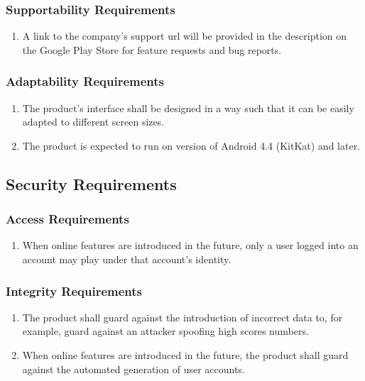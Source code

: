 \documentclass[]{article}
\begin{document}
\subsubsection{Supportability Requirements}
\label{ssub:supportability_requirements}
\begin{enumerate}[{MS}1. ]
	\resumeEnum
	\item A link to the company's support url will be provided in the description on the Google Play Store for feature requests and bug reports.
	\holdEnum
\end{enumerate}

\subsubsection{Adaptability Requirements}
\label{ssub:adaptability_requirements}
\begin{enumerate}[{MS}1. ]
	\resumeEnum
	\item The product's interface shall be designed in a way such that it can be easily adapted to different screen sizes.
	\item The product is expected to run on version of Android 4.4 (KitKat) and later.
\end{enumerate}


\subsection{Security Requirements}
\label{sub:security_requirements}

\subsubsection{Access Requirements}
\label{ssub:access_requirements}
\begin{enumerate}[{SR}1. ]
	\item When online features are introduced in the future, only a user logged into an account may play under that account's identity.
	\holdEnum
\end{enumerate}

\subsubsection{Integrity Requirements}
\label{ssub:integrity_requirements}
\begin{enumerate}[{SR}1. ]
	\resumeEnum
	\item The product shall guard against the introduction of incorrect data to, for example, guard against an attacker spoofing high scores numbers.
	\item When online features are introduced in the future, the product shall guard against the automated generation of user accounts. 
	\holdEnum
\end{enumerate}
\end{document}
